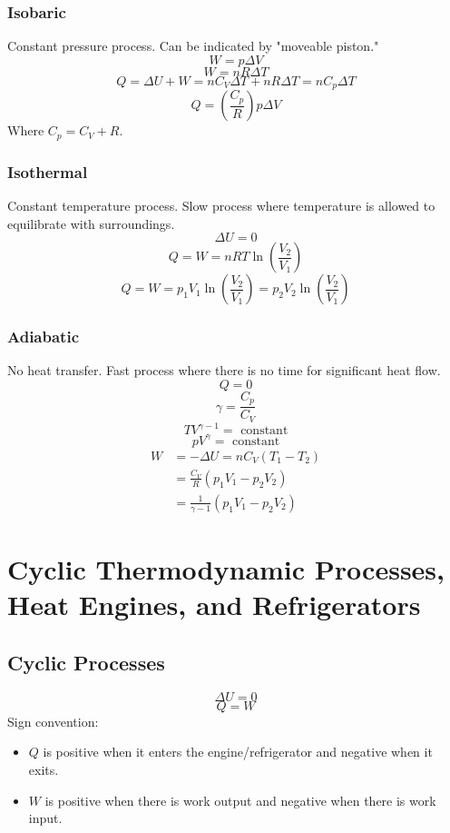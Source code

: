\documentclass{article}
\begin{document}
\subsubsection{Isobaric}
Constant pressure process. Can be indicated by "moveable piston."
\[W=p\Delta V\]
\[W=nR\Delta T\]
\[Q=\Delta U+W=nC_V\Delta T+nR\Delta T=nC_p\Delta T\]
\[Q=\left(\frac{C_p}{R}\right)p\Delta V\]
Where $C_p=C_V+R$.

\subsubsection{Isothermal}
Constant temperature process. Slow process where temperature is allowed to equilibrate with surroundings.
\[\Delta U=0\]
\[Q=W=nRT\ln\left(\frac{V_2}{V_1}\right)\]
\[Q=W=p_1V_1\ln\left(\frac{V_2}{V_1}\right)=p_2V_2\ln\left(\frac{V_2}{V_1}\right)\]

\subsubsection{Adiabatic}
No heat transfer. Fast process where there is no time for significant heat flow.
\[Q=0\]
\[\gamma=\frac{C_p}{C_V}\]
\[TV^{\gamma-1}=\text{ constant}\]
\[pV^{\gamma}=\text{ constant}\]
\begin{align*}
    W&=-\Delta U=nC_V(T_1-T_2) \\
    &= \frac{C_V}{R}(p_1V_1-p_2V_2) \\
    &= \frac{1}{\gamma-1} (p_1V_1-p_2V_2)
\end{align*}

\section{Cyclic Thermodynamic Processes, Heat Engines, and Refrigerators}

\subsection{Cyclic Processes}
\[\Delta U=0\]
\[Q=W\]
Sign convention: 
\begin{itemize}
    \item $Q$ is positive when it enters the engine/refrigerator and negative when it exits.
    \item $W$ is positive when there is work output and negative when there is work input.
\end{itemize} 
\end{document}
